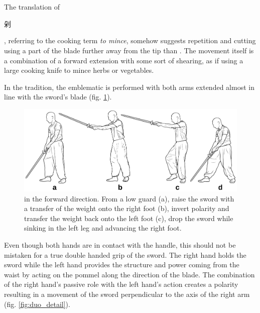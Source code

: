 \section{\Duo}
The translation of \Duo{} \begin{CJK*}{UTF8}{bsmi}剁\end{CJK*}, referring to the cooking term \textit{to mince}, somehow suggests repetition and cutting using a part of the blade further away from the tip than \Pi{}. The movement itself is a combination of a forward extension with some sort of shearing, as if using a large cooking knife to mince herbs or vegetables.

In the \Yangjia{} \Michuan{} tradition, the emblematic \Duo{} is performed with both arms extended almost in line with the sword's blade (fig. \ref{fig:duo_full}). 


\begin{figure}[ht]
	\centering
	
	\includegraphics[width=1.00\textwidth]{../../Images/JibenJianfa/Duo/../Duo/Duo.pdf}
	\caption[\Duo{}]{\Duo{} in the forward direction. From a low guard (a), raise the sword with a transfer of the weight onto the right foot (b), invert polarity and transfer the weight back onto the left foot (c), drop the sword while sinking in the left leg and advancing the right foot.}
	\label{fig:duo_full}
\end{figure} 

Even though both hands are in contact with the handle,  this should not be mistaken for a true double handed grip of the sword. The right hand holds the sword while the left hand provides the structure and power coming from the waist by acting on the pommel along the direction of the blade. The combination of the right hand's passive role with the left hand's action creates a polarity resulting in a movement of the sword perpendicular to the axis of the right arm (fig. \ref{fig:duo_detail}). 

